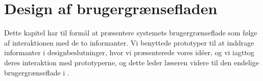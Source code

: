 \chapter{Design af brugergrænsefladen}
\label{chap:designafbrugergraenseflade}
Dette kapitel har til formål at præsentere systemets brugergrænseflade som følge af interaktionen med de to informanter. Vi benyttede prototyper til at inddrage informanter i designbeslutninger, hvor vi præsenterede vores idéer, og vi iagttog deres interaktion med prototyperne, og dette leder læseren videre til den endelige brugergrænseflade i .


